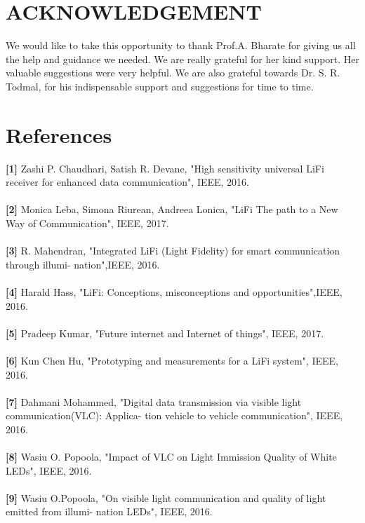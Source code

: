 \documentclass{ijcaArticle}
\begin{document}
\section{ACKNOWLEDGEMENT }
We would like to take this opportunity to thank  Prof.A. Bharate for giving us all the help and guidance we needed. We are really grateful for her kind support. Her valuable suggestions were very helpful.
We are also grateful towards Dr. S. R. Todmal, for his indispensable support and suggestions for time to time.

\section{References}

\textbf{[1]} Zashi P. Chaudhari, Satish R. Devane, "High sensitivity universal LiFi receiver for enhanced data communication", IEEE, 2016.\\
\\
\textbf{[2]} Monica Leba, Simona Riurean, Andreea Lonica, "LiFi The path to a New Way of Communication", IEEE, 2017. \\
\\
\textbf{[3]} R. Mahendran, "Integrated LiFi (Light Fidelity) for smart communication through illumi-
nation",IEEE,  2016.\\
\\
\textbf{[4]} Harald Hass, "LiFi: Conceptions, misconceptions and opportunities",IEEE,  2016.\\
\\
\textbf{[5]} Pradeep Kumar, "Future internet and Internet of things", IEEE, 2017.\\
\\
\textbf{[6]} Kun Chen Hu, "Prototyping and measurements for a LiFi system", IEEE, 2016.\\
\\
\textbf{[7]} Dahmani Mohammed, "Digital data transmission via visible light communication(VLC): Applica-
tion vehicle to vehicle communication", IEEE, 2016.\\
\\
\textbf{[8]} Wasiu O. Popoola, "Impact of VLC on Light Immission Quality of White LEDs", IEEE, 2016.\\
\\
\textbf{[9]} Wasiu O.Popoola, "On visible light communication and quality of light emitted from illumi-
nation LEDs", IEEE, 2016.\\
\end{document}
